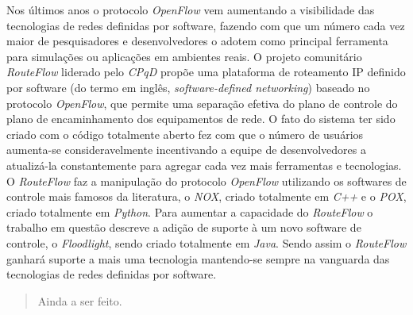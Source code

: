 \documentclass[dissertacao]{ppgccufscar}
\begin{document}
 

\capa
\folhaderosto
{}
\begin{folhadeaprovacao}
\end{folhadeaprovacao}

\begin{resumo}

Nos últimos anos o protocolo \textit{OpenFlow} vem aumentando a visibilidade das tecnologias de redes definidas por software, fazendo com que um número cada vez maior de pesquisadores e desenvolvedores o adotem como principal ferramenta para simulações ou aplicações em ambientes reais. O projeto comunitário \textit{RouteFlow} liderado pelo \textit{CPqD} propõe uma plataforma de roteamento IP definido por software (do termo em inglês, \textit{software-defined networking}) baseado no protocolo \textit{OpenFlow}, que permite uma separação efetiva do plano de controle do plano de encaminhamento dos equipamentos de rede. O fato do sistema ter sido criado com o código totalmente aberto fez com que o número de usuários aumenta-se consideravelmente incentivando a equipe de desenvolvedores a atualizá-la constantemente para agregar cada vez mais ferramentas e tecnologias. O \textit{RouteFlow} faz a manipulação do protocolo \textit{OpenFlow} utilizando os softwares de controle mais famosos da literatura, o \textit{NOX}, criado totalmente em \textit{C++} e o \textit{POX}, criado totalmente em \textit{Python}. Para aumentar a capacidade do \textit{RouteFlow} o trabalho em questão descreve a adição de suporte à um novo software de controle, o \textit{Floodlight}, sendo criado totalmente em \textit{Java}. Sendo assim o \textit{RouteFlow} ganhará suporte a mais uma tecnologia mantendo-se sempre na vanguarda das tecnologias de redes definidas por software.     

\end{resumo}

\begin{abstract}
Ainda a ser feito.

\end{abstract}

\listoffigures
\listoftables

\listofacronyms

\tableofcontents









\nocite{*}

\end{document}
